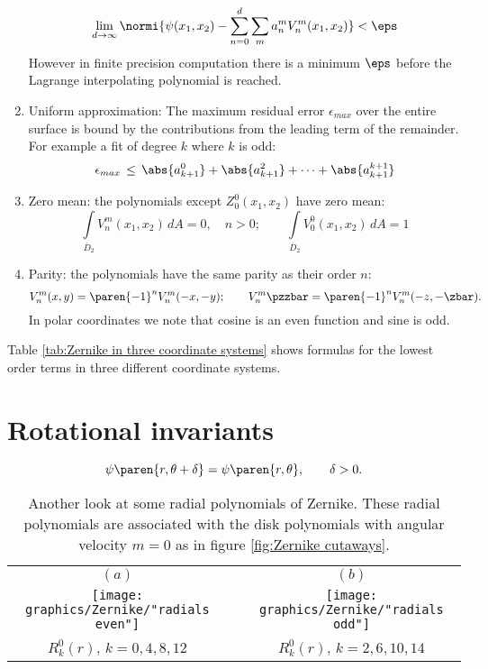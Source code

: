 \begin{enumerate}
$$ \lim_{d\to\infty} \normi{\psi(x_1,x_2) - \sum_{n=0}^{d}{\sum_{m}{a_n^m V_n^m(x_1,x_2)}}} < \eps $$
However in finite precision computation there is a minimum $\eps$ before the Lagrange interpolating polynomial is reached.
%
\item Uniform approximation: The maximum residual error $\epsilon_{max}$ over the entire surface is bound by the contributions from the leading term of the remainder. For example a fit of degree $k$ where $k$ is odd:
$$\epsilon_{max} \, \le \, \abs{a_{k+1}^{0}} + \abs{a_{k+1}^{2}} + \dots + \abs{a_{k+1}^{k+1}}$$
%
\item Zero mean: the polynomials except $Z_0^0(x_1,x_2)$ have zero mean:
$$ \int\limits_{\overline{D}_2}{V_n^m(x_1,x_2)\,dA} = 0, \quad n>0; \qquad \int\limits_{\overline{D}_2}{V_0^0(x_1,x_2)\,dA} = 1$$
%
\item Parity: the polynomials have the same parity as their order $n$:
\begin{equation*}
  V_{n}^{m} (x,y) = \paren{-1}^{n}V_{n}^{m} (-x,-y); \qquad V_{n}^{m} \pzzbar = \paren{-1}^{n} V_{n}^{m} (-z,-\zbar).
\end{equation*}
In polar coordinates we note that cosine is an even function and sine is odd.
%
\end{enumerate}

Table \eqref{tab:Zernike in three coordinate systems} shows formulas for the lowest order terms in three different coordinate systems.



\section{Rotational invariants}
\begin{equation}
  \psi \paren{r,\theta + \delta} = \psi \paren{r,\theta}, \qquad \delta > 0.
\end{equation}

\begin{table}[htdp]
\caption[Another look at some radial polynomials of Zernike]{Another look at some radial polynomials of Zernike. These radial polynomials are associated with the disk polynomials with angular velocity $m=0$ as in figure \eqref{fig:Zernike cutaways}.}
\begin{center}
\begin{tabular}{ccc}
$(a)$ & \phantom{m} & $(b)$ \\[10pt]
\texttt{[image: graphics/Zernike/"radials even"]} &&
\texttt{[image: graphics/Zernike/"radials odd"]} \\
$R_{k}^{0}(r)$, $k=0,4,8,12$ &&
$R_{k}^{0}(r)$, $k=2,6,10,14$
\end{tabular}
\end{center}
\label{fig:Zernike radials}
\end{table}%


